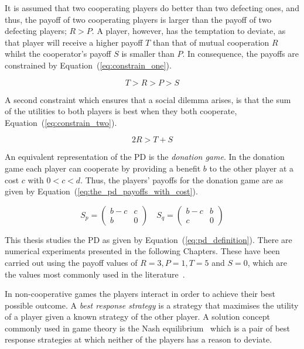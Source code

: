 It is assumed that two cooperating players do better than two defecting ones,
and thus, the payoff of two cooperating players is
larger than the payoff of two defecting players; \(R > P\). A player, however, has the
temptation to deviate, as that player will receive a higher payoff \(T\) than
that of mutual cooperation \(R\) whilst the cooperator's payoff \(S\) is smaller than
\(P\). In consequence, the payoffs are constrained by
Equation~(\ref{eq:constrain_one}).

\begin{equation}\label{eq:constrain_one}
    T > R > P > S
\end{equation}

A second constraint which ensures that a social dilemma arises, is that the sum
of the utilities to both players is best when they both cooperate,
Equation~(\ref{eq:constrain_two}).

\begin{equation}\label{eq:constrain_two}
    2R > T + S
\end{equation}

An equivalent representation of the PD is the \textit{donation game}. In the
donation game each player can cooperate by providing a benefit \(b\) to the
other player at a cost \(c\) with \(0 < c < d\). Thus, the players' payoffs for
the donation game are as given by Equation~(\ref{eq:the_pd_payoffs_with_cost}).

\begin{equation}\label{eq:the_pd_payoffs_with_cost}
    S_p =
    \begin{pmatrix}
        b - c & c\\
        b & 0
    \end{pmatrix}
    \quad
    S_q =
    \begin{pmatrix}
        b - c & b  \\
        c & 0
    \end{pmatrix}
\end{equation}

This thesis studies the PD as given by Equation~(\ref{eq:pd_definition}). There
are numerical experiments presented in the following Chapters. These have been
carried out using the payoff values of \(R = 3, P = 1, T = 5\) and \(S =
0\), which are the values most commonly used in the
literature~\cite{Adami2013, Axelrod1984,  Beaufils1988, Bendor1991, Donninger1986,
Franken2005, Knight2017, Harper2017, kendall2007iterated, Knight2018, Li2007,
A.Rogers2007Ctpw, Stewart2012}.

In non-cooperative games the players interact in order to achieve their best 
possible outcome. A \textit{best response strategy} is a strategy
that maximises the utility of a player given a known strategy of the other
player. A solution concept commonly used in game theory is the Nash equilibrium~\cite{Nash1951}
which is a pair of best response strategies at which neither of the players has
a reason to deviate.

